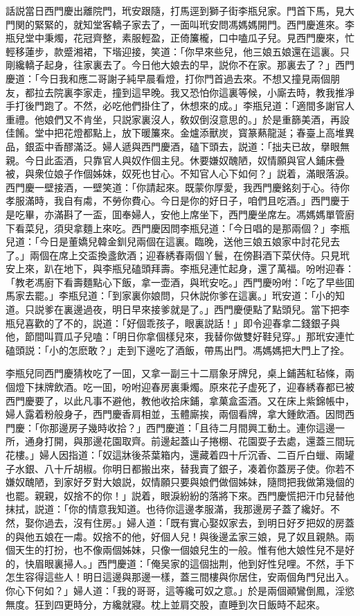話説當日西門慶出離院門，玳安跟隨，打馬逕到獅子街李瓶兒家。門首下馬，見大門関的緊緊的，就知堂客轎子家去了，一面叫玳安問馮媽媽開門。西門慶進來。李瓶兒堂中秉燭，花冠齊整，素服輕盈，正倚簾櫳，口中嗑瓜子兒。見西門慶來，忙輕移蓮步，款蹙湘裙，下堦迎接，笑道：「你早來些兒，他三娘五娘還在這裏。只剛纔轎子起身，往家裏去了。今日他大娘去的早，説你不在家。那裏去了？」西門慶道：「今日我和應二哥謝子純早晨看燈，打你門首過去來。不想又撞見兩個朋友，都拉去院裏李家走，撞到這早晚。我又恐怕你這裏等候，小廝去時，教我推凈手打後門跑了。不然，必吃他們掛住了，休想來的成。」李瓶兒道：「適間多謝官人重禮。他娘們又不肯坐，只説家裏沒人，敎奴倒沒意思的。」於是重篩美酒，再設佳餚。堂中把花燈都點上，放下暖簾來。金爐添獸炭，寳篆爇龍涎；春臺上高堆異品，銀盃中香醪滿泛。婦人遞與西門慶酒，磕下頭去，説道：「拙夫已故，擧眼無親。今日此盃酒，只靠官人與奴作個主兒。休要嫌奴醜陋，奴情願與官人鋪床疊被，與衆位娘子作個姊妹，奴死也甘心。不知官人心下如何？」説着，滿眼落淚。西門慶一壁接酒，一壁笑道：「你請起來。既蒙你厚愛，我西門慶銘刻于心。待你孝服滿時，我自有䖏，不勞你費心。今日是你的好日子，咱們且吃酒。」西門慶于是吃畢，亦滿斟了一盃，囬奉婦人，安他上席坐下，西門慶坐席左。馮媽媽單管廚下看菜兒，須臾拿麵上來吃。西門慶因問李瓶兒道：「今日唱的是那兩個？」李瓶兒道：「今日是董嬌兒韓金釧兒兩個在這裏。臨晚，送他三娘五娘家中討花兒去了。」兩個在席上交盃換盞飲酒；迎春綉春兩個丫鬟，在傍斟酒下菜伏侍。只見玳安上來，趴在地下，與李瓶兒磕頭拜壽。李瓶兒連忙起身，還了萬福。吩咐迎春：「教老馮廚下看壽麵點心下飯，拿一壶酒，與玳安吃。」西門慶吩咐：「吃了早些囬馬家去罷。」李瓶兒道：「到家裏你娘問，只休説你爹在這裏。」玳安道：「小的知道。只説爹在裏邊過夜，明日早來接爹就是了。」西門慶便點了點頭兒。當下把李瓶兒喜歡的了不的，説道：「好個乖孩子，眼裏説話！」即令迎春拿二錢銀子與他，節間叫買瓜子兒嗑：「明日你拿個樣兒來，我替你做雙好鞋兒穿。」那玳安連忙磕頭説：「小的怎麽敢？」走到下邊吃了酒飯，帶馬出門。馮媽媽把大門上了拴。

李瓶兒同西門慶猜枚吃了一囬，又拿一副三十二扇象牙牌兒，桌上鋪茜紅毡條，兩個燈下抹牌飲酒。吃一囬，吩咐迎春房裏秉燭。原來花子虚死了，迎春綉春都已被西門慶要了，以此凡事不避他，教他收拾床鋪，拿菓盒盃酒。又在床上紫錦帳中，婦人露着粉般身子，西門慶香肩相並，玉體廝挨，兩個看牌，拿大鍾飲酒。因問西門慶：「你那邊房子幾時收拾？」西門慶道：「且待二月間興工動土。連你這邊一所，通身打開，與那邊花園取齊。前邊起蓋山子捲棚、花園耍子去處，還蓋三間玩花樓。」婦人因指道：「奴這牀後茶葉箱内，還藏着四十斤沉香、二百斤白蠟、兩罐子水銀、八十斤胡椒。你明日都搬出來，替我賣了銀子，凑着你蓋房子使。你若不嫌奴醜陋，到家好歹對大娘説，奴情願只要與娘們做個姊妹，隨問把我做第幾個的也罷。親親，奴捨不的你！」説着，眼淚紛紛的落將下來。西門慶慌把汗巾兒替他抹拭，説道：「你的情意我知道。也待你這邊孝服滿，我那邊房子蓋了纔好。不然，娶你過去，沒有住房。」婦人道：「既有實心娶奴家去，到明日好歹把奴的房蓋的與他五娘在一䖏。奴捨不的他，好個人兒！與後邊孟家三娘，見了奴且親熱。兩個天生的打扮，也不像兩個姊妹，只像一個娘兒生的一般。惟有他大娘性兒不是好的，快眉眼裏掃人。」西門慶道：「俺吴家的這個拙荆，他到好性兒哩。不然，手下怎生容得這些人！明日這邊與那邊一樣，蓋三間樓與你居住，安兩個角門兒出入。你心下何如？」婦人道：「我的哥哥，這等纔可奴之意。」於是兩個顚鸞倒鳳，淫慾無度。狂到四更時分，方纔就寢。枕上並肩交股，直睡到次日飯時不起來。

